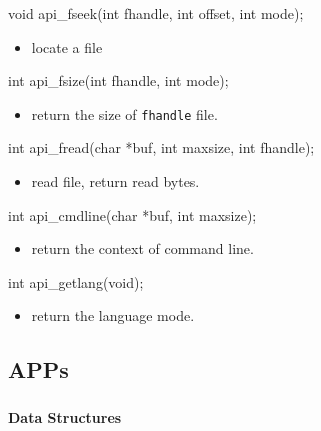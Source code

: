 \documentclass{swfcthesis}
\begin{document}
\begin{ccode}
void api_fseek(int fhandle, int offset, int mode);
\end{ccode}
\begin{itemize}
\item locate a file
\end{itemize}



\begin{ccode}
int api_fsize(int fhandle, int mode);
\end{ccode}
\begin{itemize}
\item return the size of \texttt{fhandle} file.
\end{itemize}



\begin{ccode}
int api_fread(char *buf, int maxsize, int fhandle);
\end{ccode}
\begin{itemize}
\item read file, return read bytes. 
\end{itemize}



\begin{ccode}
int api_cmdline(char *buf, int maxsize);
\end{ccode}
\begin{itemize}
\item return the context of command line.
\end{itemize}



\begin{ccode}
int api_getlang(void);
\end{ccode}
\begin{itemize}
\item return the language mode.
\end{itemize}



\subsection{APPs}
\label{sec:apps-1}


\subsubsection{}
\label{sec:}


  
\paragraph{Data Structures}
\end{document}
